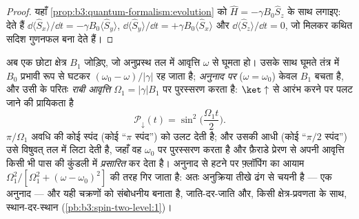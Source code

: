 \begin{proof}
यहाँ \cref{prop:b3:quantum-formalism:evolution} को $\hat H =
-\gamma B_0\hat S_z$ के साथ लगाइए:  देते हैं $\dd\langle\hat
S_x\rangle/\dd t = -\gamma B_0\langle\hat S_y\rangle$,
$\dd\langle\hat S_y\rangle/\dd t = +\gamma B_0\langle\hat
S_x\rangle$ और $\dd\langle\hat S_z\rangle/\dd t = 0$, जो मिलकर
कथित सदिश गुणनफल बना देते हैं।
\end{proof}

\begin{proposition}[चुंबकीय अनुनाद]\label{prop:b3:spin-two-level:rabi}
अब एक छोटा क्षेत्र $B_1$ जोड़िए, जो अनुप्रस्थ तल में आवृत्ति
$\omega$ से घूमता हो। उसके साथ घूमते तंत्र में $B_0$
प्रभावी रूप से घटकर $(\omega_0 - \omega)/|\gamma|$ रह जाता है;
\emph{अनुनाद पर} ($\omega = \omega_0$) केवल $B_1$ बचता है, और 
उसी के परितः \emph{राबी आवृत्ति} $\Omega_1 =
|\gamma|B_1$ पर पुरस्सरण करता है: $\ket\uparrow$ से आरंभ करने पर
पलट जाने की प्रायिकता है
\[
\mathcal P_\downarrow(t) = \sin^2\Big(\frac{\Omega_1t}{2}\Big) .
\]
$\pi/\Omega_1$ अवधि की कोई स्पंद (कोई ``$\pi$ स्पंद'')
 को उलट देती है; और उसकी आधी (कोई ``$\pi/2$ स्पंद'') उसे
विषुवत् तल में लिटा देती है, जहाँ वह $\omega_0$ पर पुरस्सरण करता है और
फ़ैराडे प्रेरण से अपनी आवृत्ति किसी भी पास की कुंडली में
\emph{प्रसारित} कर देता है। अनुनाद से हटने पर
फ़्लॉपिंग का आयाम $\Omega_1^2/[\Omega_1^2 +
(\omega - \omega_0)^2]$ की तरह गिर जाता है: अतः अनुक्रिया तीखे ढंग से
चयनी है --- एक अनुनाद --- और यही चक्रणों को संबोधनीय बनाता है,
जाति-दर-जाति और, किसी क्षेत्र-प्रवणता के साथ, स्थान-दर-स्थान
(\cref{pb:b3:spin-two-level:1})।
\end{proposition}
\admitted

